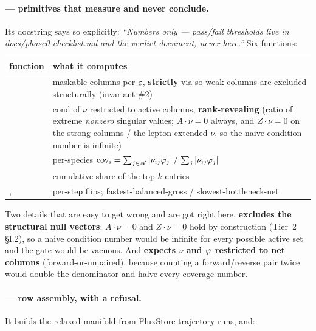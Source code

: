 \paragraph{ --- primitives that measure and never
conclude.} Its docstring says so explicitly: \emph{``Numbers only --- pass/fail
thresholds live in docs/phase0-checklist.md and the verdict document, never
here.''} Six functions:

\begingroup\small
\begin{tabularx}{\textwidth}{@{}L{3.6cm} Y@{}}
\toprule
\textbf{function} & \textbf{what it computes} \\
\midrule
{} & maskable columns per $\varepsilon$, \textbf{strictly} via
   so weak columns are excluded
  structurally (invariant \#2) \\
 & cond of $\nu$ restricted to active columns,
  \textbf{rank-revealing} (ratio of extreme \emph{nonzero} singular values;
  $A\cdot\nu = 0$ always, and $Z\cdot\nu = 0$ on the strong columns / the
  lepton-extended $\nu$, so the naive condition number is infinite) \\
 & per-species $\mathrm{cov}_i = \sum_{j\in\mathscr{A}}
  |\nu_{ij}\varphi_j| \,/\, \sum_j |\nu_{ij}\varphi_j|$ \\
 & cumulative share of the top-$k$ entries \\
,  & per-step flips;
  fastest-balanced-gross / slowest-bottleneck-net \\
\bottomrule
\end{tabularx}
\endgroup

Two details that are easy to get wrong and are got right here.
\textbf{ excludes the structural null vectors}:
$A\cdot\nu = 0$ and $Z\cdot\nu = 0$ hold by construction (Tier~2 \S I.2), so a
naive condition number would be infinite for every possible active set and the
gate would be vacuous. And \textbf{ expects $\nu$ and
$\varphi$ restricted to net columns} (forward-or-unpaired), because counting a
forward/reverse pair twice would double the denominator and halve every coverage
number.

\paragraph{ --- row assembly, with a refusal.} It builds the
relaxed manifold from FluxStore trajectory runs, and:

